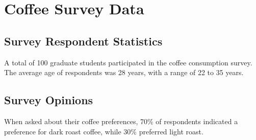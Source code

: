 \chapter{Coffee Survey Data}

\section{Survey Respondent Statistics}
A total of 100 graduate students participated in the coffee consumption survey.
The average age of respondents was 28 years, with a range of 22 to 35 years.

\section{Survey Opinions}
When asked about their coffee preferences, 70\% of respondents indicated a
preference for dark roast coffee, while 30\% preferred light roast.